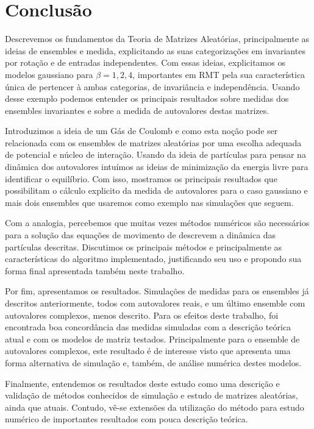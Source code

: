 \chapter{Conclusão}
\label{Capitulo: Conclusão}

Descrevemos os fundamentos da Teoria de Matrizes Aleatórias, principalmente as ideias de ensembles e medida, explicitando as suas categorizações em invariantes por rotação e de entradas independentes. Com essas ideias, explicitamos os modelos gaussiano para $\beta = 1,2,4$, importantes em RMT pela sua característica única de pertencer à ambas categorias, de invariância e independência. Usando desse exemplo podemos entender os principais resultados sobre medidas dos ensembles invariantes e sobre a medida de autovalores destas matrizes.
 
Introduzimos a ideia de um Gás de Coulomb e como esta noção pode ser relacionada com os ensembles de matrizes aleatórias por uma escolha adequada de potencial e núcleo de interação. Usando da ideia de partículas para pensar na dinâmica dos autovalores intuímos as ideias de minimização da energia livre para identificar o equilíbrio. Com isso, mostramos os principais resultados que possibilitam o cálculo explicito da medida de autovalores para o caso gaussiano e mais dois ensembles que usaremos como exemplo nas simulações que seguem.

Com a analogia, percebemos que muitas vezes métodos numéricos são necessários para a solução das equações de movimento de descrevem a dinâmica das partículas descritas. Discutimos os principais métodos e principalmente as características do algoritmo implementado, justificando seu uso e propondo sua forma final apresentada também neste trabalho.

Por fim, apresentamos os resultados. Simulações de medidas para os ensembles já descritos anteriormente, todos com autovalores reais, e um último ensemble com autovalores complexos, menos descrito. Para os efeitos deste trabalho, foi encontrada boa concordância das medidas simuladas com a descrição teórica atual e com os modelos de matriz testados. Principalmente para o ensemble de autovalores complexos, este resultado é de interesse visto que apresenta uma forma alternativa de simulação e, também, de análise numérica destes modelos.

Finalmente, entendemos os resultados deste estudo como uma descrição e validação de métodos conhecidos de simulação e estudo de matrizes aleatórias, ainda que atuais. Contudo, vê-se extensões da utilização do método para estudo numérico de importantes resultados com pouca descrição teórica.
